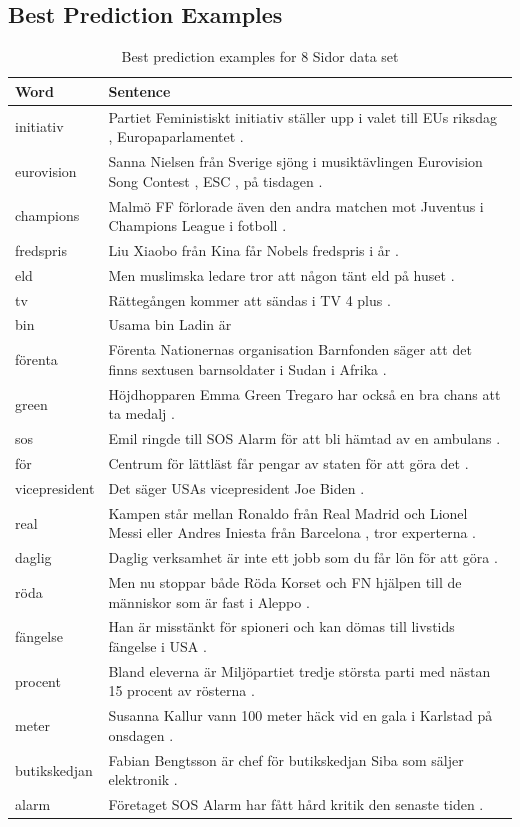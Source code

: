 \documentclass[11pt,a4paper]{article}
\begin{document}
\subsection{Best Prediction Examples}

\begin{table}[h!]
\centering
\begin{tabular}{l p{10cm}}
\toprule
   Word &                                                                                                              Sentence \\
\midrule
 initiativ &  Partiet Feministiskt initiativ ställer upp i valet till EUs riksdag , Europaparlamentet . \\
 eurovision &  Sanna Nielsen från Sverige sjöng i musiktävlingen Eurovision Song Contest , ESC , på tisdagen . \\
 champions &  Malmö FF förlorade även den andra matchen mot Juventus i Champions League i fotboll . \\
 fredspris &  Liu Xiaobo från Kina får Nobels fredspris i år . \\
 eld &  Men muslimska ledare tror att någon tänt eld på huset . \\
 tv &  Rättegången kommer att sändas i TV 4 plus . \\
 bin &  Usama bin Ladin är \\
 förenta &  Förenta Nationernas organisation Barnfonden säger att det finns sextusen barnsoldater i Sudan i Afrika . \\
 green &  Höjdhopparen Emma Green Tregaro har också en bra chans att ta medalj . \\
 sos &  Emil ringde till SOS Alarm för att bli hämtad av en ambulans . \\
 för &  Centrum för lättläst får pengar av staten för att göra det . \\
 vicepresident &  Det säger USAs vicepresident Joe Biden . \\
 real &  Kampen står mellan Ronaldo från Real Madrid och Lionel Messi eller Andres Iniesta från Barcelona , tror experterna . \\
 daglig &  Daglig verksamhet är inte ett jobb som du får lön för att göra . \\
 röda &  Men nu stoppar både Röda Korset och FN hjälpen till de människor som är fast i Aleppo . \\
 fängelse &  Han är misstänkt för spioneri och kan dömas till livstids fängelse i USA . \\
 procent &  Bland eleverna är Miljöpartiet tredje största parti med nästan 15 procent av rösterna . \\
 meter &  Susanna Kallur vann 100 meter häck vid en gala i Karlstad på onsdagen . \\
 butikskedjan &  Fabian Bengtsson är chef för butikskedjan Siba som säljer elektronik . \\
 alarm &  Företaget SOS Alarm har fått hård kritik den senaste tiden . \\
\bottomrule
\end{tabular}
\caption{Best prediction examples for 8 Sidor data set}\label{tab:pred_examples}
\end{table}
\end{document}
